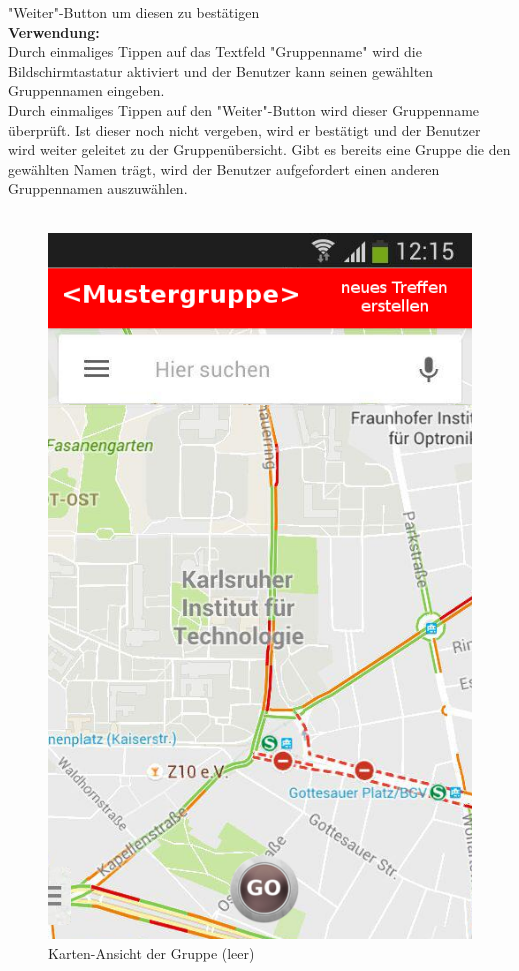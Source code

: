 "Weiter"-Button um diesen zu bestätigen\\
\textbf{Verwendung:}\\
Durch einmaliges Tippen auf das Textfeld "Gruppenname" wird die Bildschirmtastatur aktiviert und der Benutzer kann seinen gewählten Gruppennamen eingeben.\\
Durch einmaliges Tippen auf den "Weiter"-Button wird dieser Gruppenname überprüft. Ist dieser noch nicht vergeben, wird er bestätigt und der Benutzer wird weiter geleitet zu der Gruppenübersicht. Gibt es bereits eine Gruppe die den gewählten Namen trägt, wird der Benutzer aufgefordert einen anderen Gruppennamen auszuwählen.\\ \\


\begin{figure}[H]
	\caption{Karten-Ansicht der Gruppe (leer)}
\begin{center}
	\includegraphics[scale =0.5]{resources/images/map_leer_Admin.png}
\end{center}
\end{figure}
